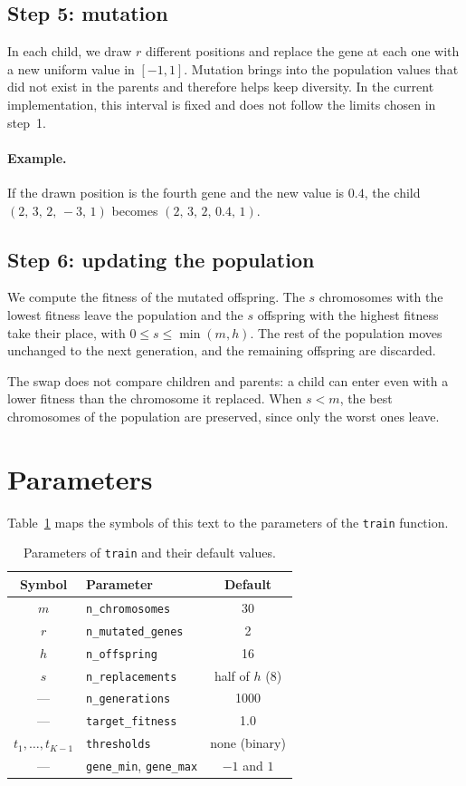 \documentclass[11pt,a4paper]{article}
\newcommand{\cod}[1]{\texttt{#1}}
\begin{document}
\subsection*{Step 5: mutation}

In each child, we draw $r$ different positions and replace the gene at each one with
a new uniform value in $[-1, 1]$. Mutation brings into the population values that did
not exist in the parents and therefore helps keep diversity. In the current
implementation, this interval is fixed and does not follow the limits chosen in
step~1.

\paragraph{Example.} If the drawn position is the fourth gene and the new value is
$0.4$, the child $(2,\, 3,\, 2,\, -3,\, 1)$ becomes $(2,\, 3,\, 2,\, 0.4,\, 1)$.

\subsection*{Step 6: updating the population}

We compute the fitness of the mutated offspring. The $s$ chromosomes with the lowest
fitness leave the population and the $s$ offspring with the highest fitness take
their place, with $0 \leq s \leq \min(m, h)$. The rest of the population moves
unchanged to the next generation, and the remaining offspring are discarded.

The swap does not compare children and parents: a child can enter even with a lower
fitness than the chromosome it replaced. When $s < m$, the best chromosomes of the
population are preserved, since only the worst ones leave.

\section{Parameters}

Table~\ref{tab:parameters} maps the symbols of this text to the parameters of the
\cod{train} function.

\begin{table}[ht]
\centering
\caption{Parameters of \cod{train} and their default values.}
\label{tab:parameters}
\begin{tabular}{clc}
\toprule
Symbol & Parameter & Default \\
\midrule
$m$ & \cod{n\_chromosomes} & 30 \\
$r$ & \cod{n\_mutated\_genes} & 2 \\
$h$ & \cod{n\_offspring} & 16 \\
$s$ & \cod{n\_replacements} & half of $h$ (8) \\
--- & \cod{n\_generations} & 1000 \\
--- & \cod{target\_fitness} & 1.0 \\
$t_1, \dots, t_{K-1}$ & \cod{thresholds} & none (binary) \\
--- & \cod{gene\_min}, \cod{gene\_max} & $-1$ and $1$ \\
\bottomrule
\end{tabular}
\end{table}
\end{document}
